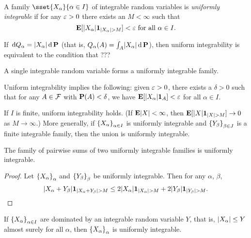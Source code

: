 \begin{definition*} \label{def:unif-int}
    A family $\sset{X_\alpha}{\alpha \in I}$ of integrable random variables
    is \emph{uniformly integrable} if for any $\eps > 0$ there exists
    an $M < \infty$ such that \[
        \E[\abs{X_\alpha} \1{\abs{X_\alpha} > M}] < \eps
        \text{ for all } \alpha \in I.
    \]
\end{definition*}
\begin{remarks}
    \item If $\dd Q_\alpha = \abs{X_\alpha} \dd \P$
        (that is, $Q_\alpha(A) = \int_A \abs{X_\alpha} \dd \P$),
        then uniform integrability is equivalent to the condition that
        ???
    \item A single integrable random variable forms a uniformly integrable
        family.
    \item Uniform integrability implies the following: given $\eps > 0$,
        there exists a $\delta > 0$ such that for any $A \in \F$ with
        $\P(A) < \delta$, we have $\E[\abs{X_\alpha} \1A] < \eps$ for
        all $\alpha \in I$. \TODO[Pf]
    \item If $I$ is finite, uniform integrability holds.
        (If $\E\abs X < \infty$, then $\E[\abs X \1{\abs{X} > M}] \to 0$
        as $M \to \infty$.)
        More generally, if ${\set{X_\alpha}}_{\alpha \in I}$ is uniformly
        integrable and ${\set{Y_\beta}}_{\beta \in J}$ is a finite integrable
        family, then the union is uniformly integrable.
    \item The family of pairwise sums of two uniformly integrable families
        is uniformly integrable.
        \begin{proof}
            Let ${\set{X_\alpha}}_\alpha$ and ${\set{Y_\beta}}_\beta$ be
            uniformly integrable.
            Then for any $\alpha$, $\beta$, \[
                \abs{X_\alpha + Y_\beta} \1{\abs{X_\alpha + Y_\beta} > M}
                    \le 2 \abs{X_\alpha} \1{\abs{X_\alpha} > M} +
                        2 \abs{Y_\beta} \1{\abs{Y_\beta} > M}. \qedhere
            \]
        \end{proof}
    \item If ${\set{X_\alpha}}_{\alpha \in I}$ are dominated by an integrable
        random variable $Y$, that is, $\abs{X_\alpha} \le Y$ almost surely
        for all $\alpha$, then ${\set{X_\alpha}}_\alpha$ is uniformly
        integrable.


\end{remarks}
